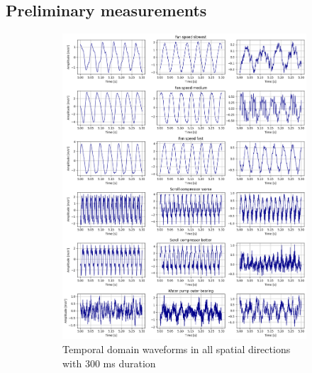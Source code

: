 \subsection{Preliminary measurements}
\begin{figure}[ht]
    \centering
    \begin{subfigure}[b]{0.44\textwidth}
        \includegraphics[width=\textwidth]{assets/design/EDA-custom-dataset-temporal.png}
        \caption{Temporal domain waveforms in all spatial directions with 300 ms duration}
    \end{subfigure}
    \hfill
    \begin{subfigure}[b]{0.55\textwidth}

\end{subfigure}
\end{figure}

